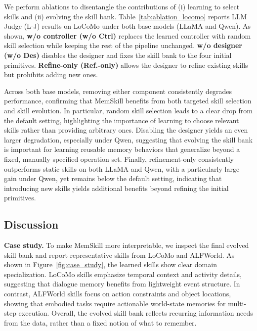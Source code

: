 We perform ablations to disentangle the contributions of (i) learning to select skills and (ii) evolving the skill bank. Table~\ref{tab:ablation_locomo} reports LLM Judge (L-J) results on LoCoMo under both base models (LLaMA and Qwen). 
As shown, \textbf{w/o controller (w/o Ctrl)} replaces the learned controller with random skill selection while keeping the rest of the pipeline unchanged. 
\textbf{w/o designer (w/o Des)} disables the designer and fixes the skill bank to the four initial primitives. 
\textbf{Refine-only (Ref.-only)} allows the designer to refine existing skills but prohibits adding new ones.



Across both base models, removing either component consistently degrades performance, confirming that MemSkill benefits from both targeted skill selection and skill evolution. 
In particular, random skill selection leads to a clear drop from the default setting, highlighting the importance of learning to choose relevant skills rather than providing arbitrary ones. 
Disabling the designer yields an even larger degradation, especially under Qwen, suggesting that evolving the skill bank is important for learning reusable memory behaviors that generalize beyond a fixed, manually specified operation set. 
Finally, refinement-only consistently outperforms static skills on both LLaMA and Qwen, with a particularly large gain under Qwen, yet remains below the default setting, indicating that introducing new skills yields additional benefits beyond refining the initial primitives.











\subsection{Discussion}
\label{sec:case_study}




\textbf{Case study.}
To make MemSkill more interpretable, we inspect the final evolved skill bank and report representative skills from LoCoMo and ALFWorld. 
As shown in Figure~\ref{fig:case_study}, the learned skills show clear domain specialization. 
LoCoMo skills emphasize temporal context and activity details, suggesting that dialogue memory benefits from lightweight event structure. In contrast, ALFWorld skills focus on action constraints and object locations, showing that embodied tasks require actionable world-state memories for multi-step execution.
Overall, the evolved skill bank reflects recurring information needs from the data, rather than a fixed notion of what to remember.

